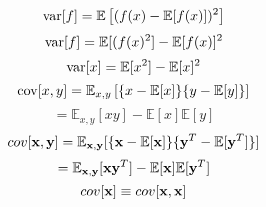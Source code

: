 $${\rm var}[f]=\mathbb{E}\left[ (f(x)-\mathbb{E}[f(x)])^{2} \right]$$
$${\rm var}[f]=\mathbb{E}[(f(x)^{2}]-\mathbb{E}[f(x)]^{2}$$
$${\rm var}[x]=\mathbb{E}[x^{2}]-\mathbb{E}[x]^{2}$$
$${\rm cov}[x,y]=\mathbb{E}_{x,y}\left[\{x-\mathbb{E}[x]\}\{y-\mathbb{E}[y]\}\right]$$
$$=\mathbb{E}_{x,y}[xy]-\mathbb{E}[x]\mathbb{E}[y]$$
$$cov[{\bf x},{\bf y}]=\mathbb{E}_{{\bf x},{\bf y}}[\{{\bf x}-\mathbb{E}[{\bf x}]\}\{{\bf y}^{T}-\mathbb{E}[{\bf y}^{T}]\}]$$
$$=\mathbb{E}_{{\bf x},{\bf y}}[{\bf x}{\bf y}^{T}]-\mathbb{E}[{\bf x}]\mathbb{E}[{\bf y}^{T}]$$
$$cov[{\bf x}]\equiv cov[{\bf x},{\bf x}]$$
